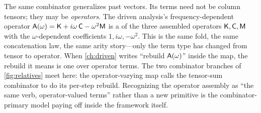 The same combinator generalizes past vectors. Its terms need not be column tensors;
they may be \emph{operators}. The driven analysis's frequency-dependent operator
$\mathsf{A}(\omega) = \mathsf{K} + i\omega\,\mathsf{C} - \omega^2\mathsf{M}$ is a
 of the three assembled operators $\mathsf{K}, \mathsf{C}, \mathsf{M}$ with
the $\omega$-dependent coefficients $1, i\omega, -\omega^2$. This is the same fold,
the same concatenation law, the same arity story---only the term type has changed
from tensor to operator. When \cref{ch:driven} writes ``rebuild $\mathsf{A}(\omega)$''
inside the  map, the rebuild it means is one
 over operator terms. The two combinator branches of
\cref{fig:relatives} meet here: the operator-varying map calls the tensor-sum
combinator to do its per-step rebuild. Recognizing the operator assembly as ``the
same verb, operator-valued terms'' rather than a new primitive is the
combinator-primary model paying off inside the framework itself.

